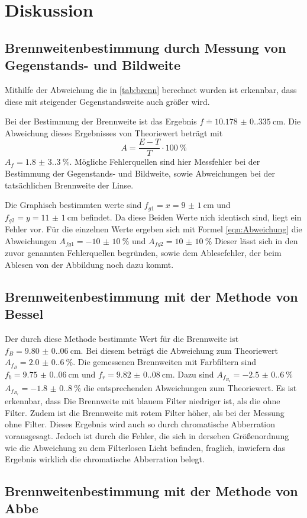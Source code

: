 \section{Diskussion}
\label{sec:Diskussion}
\subsection{Brennweitenbestimmung durch Messung von Gegenstands- und Bildweite}
Mithilfe der Abweichung die in \ref{tab:brenn} berechnet wurden ist erkennbar, dass diese mit steigender Gegenstandsweite auch größer wird.

Bei der Bestimmung der Brennweite ist das Ergebnis $f \bar=\qty{10.178(0.335)}{\centi\meter}$. 
Die Abweichung dieses Ergebnisses von Theoriewert beträgt mit 
\begin{equation}
    A=\frac{E-T}{T} \cdot \qty{100}{\percent}
    \label{eqn:Abweichung}
\end{equation}
$A_f=\qty{1.8(3.3)}{\percent}$.
Mögliche Fehlerquellen sind hier Messfehler bei der Bestimmung der Gegenstands- und Bildweite, sowie Abweichungen bei der tatsächlichen Brennweite der Linse.

Die Graphisch bestimmten werte sind $f_{g1}=x=\qty{9(1)}{\centi\meter}$ und $f_{g2}=y=\qty{11(1)}{\centi\meter}$ befindet.
Da diese Beiden Werte nich identisch sind, liegt ein Fehler vor.
Für die einzelnen Werte ergeben sich mit Formel \ref{eqn:Abweichung} die Abweichungen $A_{fg1}=\qty{-10(10)}{\percent}$ und $A_{fg2}=\qty{10(10)}{\percent}$
Dieser lässt sich in den zuvor genannten Fehlerquellen begründen, sowie dem Ablesefehler, der beim Ablesen von der Abbildung noch dazu kommt.

\subsection{Brennweitenbestimmung mit der Methode von Bessel}
Der durch diese Methode bestimmte Wert für die Brennweite ist $f_{B}=\qty{9.80(0.06)}{\centi\meter}$.
Bei diesem beträgt die Abweichung zum Theoriewert $A_{f_B}=\qty{2.0(0.6)}{\percent}$.
Die gemessenen Brennweiten mit Farbfiltern sind $f_b=\qty{9.75(0.06)}{\centi\meter}$ und $f_r=\qty{9.82(0.08)}{\centi\meter}$.
Dazu sind $A_{f_B_b}=\qty{-2.5(0.6)}{\percent}$ $A_{f_B_r}=\qty{-1.8(0.8)}{\percent}$ die entsprechenden Abweichungen zum Theoriewert.
Es ist erkennbar, dass Die Brennweite mit blauem Filter niedriger ist, als die ohne Filter.
Zudem ist die Brennweite mit rotem Filter höher, als bei der Messung ohne Filter.
Dieses Ergebnis wird auch so durch chromatische Abberration vorausgesagt.
Jedoch ist durch die Fehler, die sich in derseben Größenordnung wie die Abweichung zu dem Filterlosen Licht befinden, fraglich, inwiefern das Ergebnis wirklich die chromatische Abberration belegt.


\subsection{Brennweitenbestimmung mit der Methode von Abbe}

